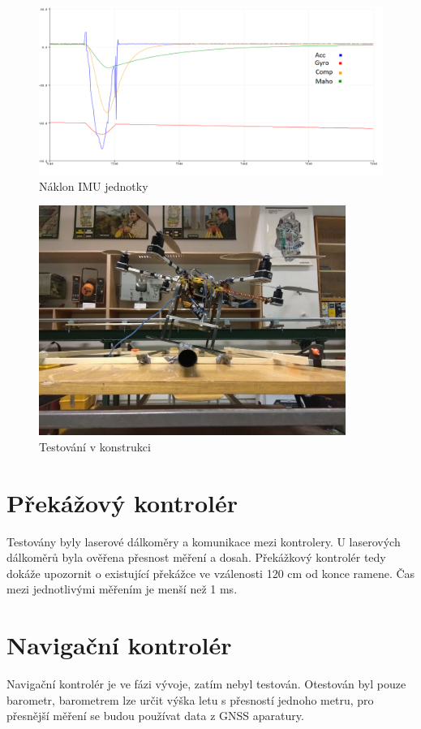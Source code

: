 \begin{figure}[H]
	\centering
	\includegraphics[width=14cm]{pictures/testRoll1}
	\caption{Náklon IMU jednotky}
\end{figure}

\begin{figure}[H]
	\centering
	\includegraphics[width=10cm]{pictures/pidtest.jpg}
	\caption{Testování v konstrukci}
\end{figure}

\section{Překážový kontrolér}
Testovány byly laserové dálkoměry a komunikace mezi kontrolery. U laserových dálkoměrů byla ověřena přesnost měření a dosah. Překážkový kontrolér tedy dokáže upozornit o existující překážce ve vzálenosti 120 cm od konce ramene. Čas mezi jednotlivými měřením je menší než 1 ms.\\

\section{Navigační kontrolér}
Navigační kontrolér je ve fázi vývoje, zatím nebyl testován. Otestován byl pouze barometr, barometrem lze určit výška letu s přesností jednoho metru, pro přesnější měření se budou používat data z GNSS aparatury.\\


